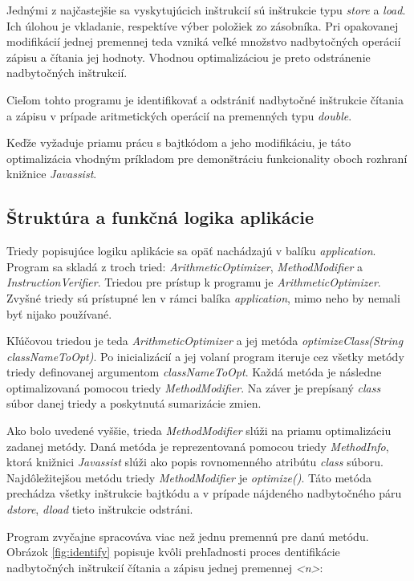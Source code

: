 \documentclass[11pt,final,oneside]{fithesis}
\begin{document}
Jednými z najčastejšie sa vyskytujúcich inštrukcií sú inštrukcie typu 
\textit{store} a \textit{load}. Ich úlohou je vkladanie, respektíve výber 
položiek zo zásobníka. Pri opakovanej modifikácií jednej premennej teda vzniká 
veľké množstvo nadbytočných operácií zápisu a čítania jej hodnoty. Vhodnou 
optimalizáciou je preto odstránenie nadbytočných inštrukcií.

Cieľom tohto programu je identifikovať a odstrániť nadbytočné inštrukcie 
čítania a zápisu v prípade aritmetických operácií na premenných typu 
\textit{double}. 

Keďže vyžaduje priamu prácu s bajtkódom a jeho modifikáciu, je táto 
optimalizácia vhodným príkladom pre demonštráciu funkcionality oboch rozhraní 
knižnice \textit{Javassist}.

\subsection{Štruktúra a funkčná logika aplikácie}
Triedy popisujúce logiku aplikácie sa opäť nachádzajú v balíku 
\textit{application}. Program sa skladá z troch tried: 
\textit{ArithmeticOptimizer}, \textit{MethodModifier} a 
\textit{InstructionVerifier}. Triedou pre prístup k programu je 
\textit{ArithmeticOptimizer}. Zvyšné triedy sú prístupné len v rámci balíka 
\textit{application}, mimo neho by nemali byť nijako používané.

Kľúčovou triedou je teda \textit{ArithmeticOptimizer} a jej metóda 
\textit{optimizeClass(String classNameToOpt)}. Po inicializácií a jej volaní 
program iteruje cez všetky metódy triedy definovanej argumentom 
\textit{classNameToOpt}. Každá metóda je následne optimalizovaná pomocou 
triedy \textit{MethodModifier}. Na záver je prepísaný \textit{class} súbor 
danej triedy a poskytnutá sumarizácie zmien.

Ako bolo uvedené vyššie, trieda \textit{MethodModifier} slúži na priamu 
optimalizáciu zadanej metódy. Daná metóda je reprezentovaná pomocou triedy 
\textit{MethodInfo}, ktorá knižnici \textit{Javassist} slúži ako popis 
rovnomenného atribútu \textit{class} súboru. Najdôležitejšou metódu triedy 
\textit{MethodModifier} je \textit{optimize()}. Táto metóda prechádza všetky 
inštrukcie bajtkódu a v prípade nájdeného nadbytočného páru \textit{dstore}, 
\textit{dload} tieto inštrukcie odstráni.

Program zvyčajne spracováva viac než jednu premennú pre danú metódu. Obrázok
\ref{fig:identify} popisuje kvôli prehľadnosti proces dentifikácie
nadbytočných inštrukcií čítania a zápisu jednej premennej \textit{<n>}:
\end{document}
